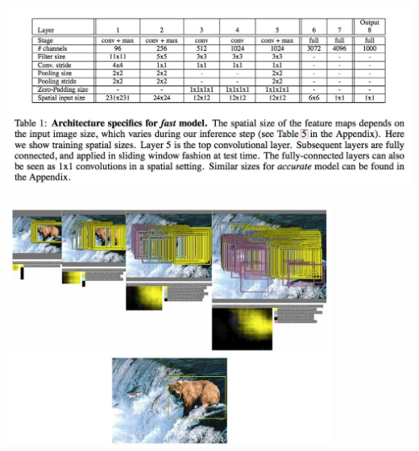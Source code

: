 \documentclass[xetex,mathserif,serif,aspectratio=169]{beamer}
\begin{document}
\begin{frame}[fragile] \frametitle{} \oldB \small

\begin{center}
\includegraphics[width=\textwidth]{img/overFeatModel.jpg}
\end{center}

\end{frame}

\begin{frame}[fragile] \frametitle{} \oldB \small

\begin{center}
\includegraphics[width=0.8\textwidth]{img/overFeatLocal.jpg}
\end{center}

\end{frame}
\end{document}
